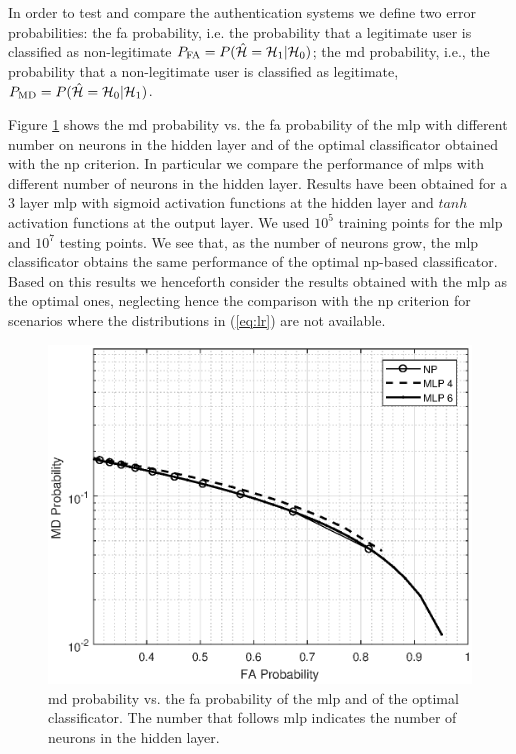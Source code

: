 \documentclass[twocolumns]{IEEEtran}
\begin{document}
In order to test and compare the authentication systems we define two error probabilities: the \ac{fa} probability, i.e. the probability  that a legitimate user is classified as non-legitimate $P_{\rm FA} =P(\hat{\mathcal H} = \mathcal H_1 | \mathcal H_0)$; the \ac{md} probability, i.e., the probability that a non-legitimate user is classified as legitimate, $P_{\rm MD}=P(\hat{\mathcal H} = \mathcal H_0 | \mathcal H_1)$.

Figure \ref{fig:NP_comp} shows the \ac{md} probability vs. the \ac{fa} probability of the \ac{mlp} with different number on neurons in the hidden layer and of the optimal classificator obtained with the  \ac{np} criterion. In particular we compare the performance of \acp{mlp} with different number of neurons in the hidden layer. Results have been obtained for a $3$ layer \ac{mlp} with sigmoid activation functions at the hidden layer and $tanh$ activation functions at the output layer. We used $10^5$ training points for the \ac{mlp} and $10^7$ testing points. We see that, as the number of neurons grow, the \ac{mlp} classificator obtains the same performance of the optimal \ac{np}-based classificator. Based on this results we henceforth consider the results obtained with the \ac{mlp} as the optimal ones, neglecting hence the comparison with the \ac{np} criterion for scenarios where the distributions in (\ref{eq:lr}) are not available.

 \begin{figure}[h]
     \centering
     \includegraphics[width=1\columnwidth]{FA_MD_LOS.eps}
     \caption{\ac{md} probability vs. the \ac{fa} probability of the \ac{mlp} and of the optimal classificator. The number that follows \ac{mlp} indicates the number of neurons in the hidden layer.}
     \label{fig:NP_comp}
 \end{figure}
\end{document}
